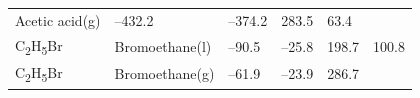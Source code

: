 \documentclass[
]{book}
\theoremstyle{definition}
\theoremstyle{definition}
\theoremstyle{definition}
\theoremstyle{remark}
\begin{document}
\begin{longtable}[]{@{}llllll@{}}
\begin{minipage}[t]{0.17\columnwidth}
Acetic acid(g)\strut
\end{minipage} & \begin{minipage}[t]{0.15\columnwidth}\raggedright
--432.2\strut
\end{minipage} & \begin{minipage}[t]{0.15\columnwidth}\raggedright
--374.2\strut
\end{minipage} & \begin{minipage}[t]{0.14\columnwidth}\raggedright
283.5\strut
\end{minipage} & \begin{minipage}[t]{0.14\columnwidth}\raggedright
63.4\strut
\end{minipage}\tabularnewline
\begin{minipage}[t]{0.07\columnwidth}\raggedright
C\textsubscript{2}H\textsubscript{5}Br\strut
\end{minipage} & \begin{minipage}[t]{0.17\columnwidth}\raggedright
Bromoethane(l)\strut
\end{minipage} & \begin{minipage}[t]{0.15\columnwidth}\raggedright
--90.5\strut
\end{minipage} & \begin{minipage}[t]{0.15\columnwidth}\raggedright
--25.8\strut
\end{minipage} & \begin{minipage}[t]{0.14\columnwidth}\raggedright
198.7\strut
\end{minipage} & \begin{minipage}[t]{0.14\columnwidth}\raggedright
100.8\strut
\end{minipage}\tabularnewline
\begin{minipage}[t]{0.07\columnwidth}\raggedright
C\textsubscript{2}H\textsubscript{5}Br\strut
\end{minipage} & \begin{minipage}[t]{0.17\columnwidth}\raggedright
Bromoethane(g)\strut
\end{minipage} & \begin{minipage}[t]{0.15\columnwidth}\raggedright
--61.9\strut
\end{minipage} & \begin{minipage}[t]{0.15\columnwidth}\raggedright
--23.9\strut
\end{minipage} & \begin{minipage}[t]{0.14\columnwidth}\raggedright
286.7\strut
\end{minipage} & \begin{minipage}[t]{0.14\columnwidth}\raggedright

\end{minipage}
\end{longtable}
\end{document}
